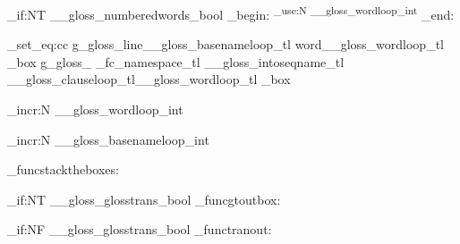 {{{{					\bool_if:NT
						\g__gloss_numberedwords_bool
						{
							\group_begin:
							\upshape
							\normalcolor
							\textsuperscript {	\int_use:N \g__gloss_wordloop_int }
							\group_end:
							}
	
			}

	\box_set_eq:cc 
{ g_gloss_line\g__gloss_basenameloop_tl word\g__gloss_wordloop_tl _box }
			{ g_gloss_ \g_fc_namespace_tl \g__gloss_intoseqname_tl \g__gloss_clauseloop_tl\g__gloss_wordloop_tl _box }



		
		\int_incr:N
					\g__gloss_wordloop_int
					
		} %


		\int_incr:N
					\g__gloss_basenameloop_int
					
		} %


\gl_funcstacktheboxes:


	\bool_if:NT
		\g__gloss_glosstrans_bool
		{ 
				\gl_funcgtoutbox:
			}				




	\bool_if:NF
		\g__gloss_glosstrans_bool
		{ 
				\gl_functranout:
			}				
}





